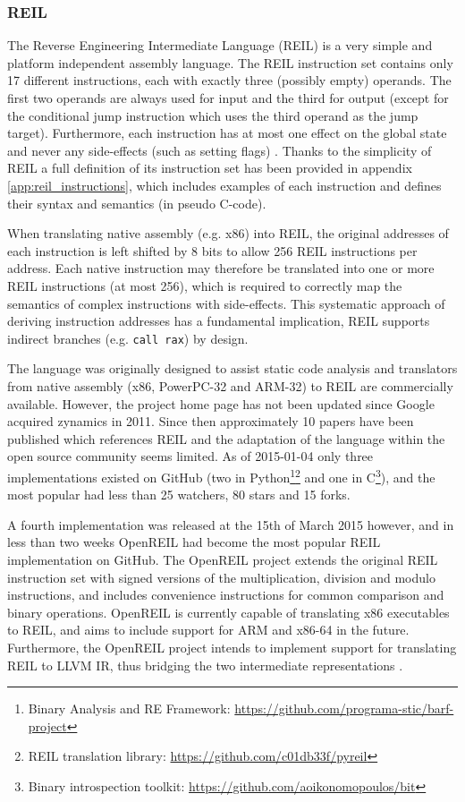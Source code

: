 
\subsubsection{REIL}
\label{sec:lit_review_reil}

The Reverse Engineering Intermediate Language (REIL) is a very simple and platform independent assembly language. The REIL instruction set contains only 17 different instructions, each with exactly three (possibly empty) operands. The first two operands are always used for input and the third for output (except for the conditional jump instruction which uses the third operand as the jump target). Furthermore, each instruction has at most one effect on the global state and never any side-effects (such as setting flags) \cite{reil_paper,reil_spec}. Thanks to the simplicity of REIL a full definition of its instruction set has been provided in appendix \ref{app:reil_instructions}, which includes examples of each instruction and defines their syntax and semantics (in pseudo C-code).

When translating native assembly (e.g. x86) into REIL, the original addresses of each instruction is left shifted by 8 bits to allow 256 REIL instructions per address. Each native instruction may therefore be translated into one or more REIL instructions (at most 256), which is required to correctly map the semantics of complex instructions with side-effects. This systematic approach of deriving instruction addresses has a fundamental implication, REIL supports indirect branches (e.g. \texttt{call rax}) by design.

The language was originally designed to assist static code analysis and translators from native assembly (x86, PowerPC-32 and ARM-32) to REIL are commercially available. However, the project home page has not been updated since Google acquired zynamics in 2011. Since then approximately 10 papers have been published which references REIL and the adaptation of the language within the open source community seems limited. As of 2015-01-04 only three implementations existed on GitHub (two in Python\footnote{Binary Analysis and RE Framework: \url{https://github.com/programa-stic/barf-project}}\footnote{REIL translation library: \url{https://github.com/c01db33f/pyreil}} and one in C\footnote{Binary introspection toolkit: \url{https://github.com/aoikonomopoulos/bit}}), and the most popular had less than 25 watchers, 80 stars and 15 forks.

A fourth implementation was released at the 15th of March 2015 however, and in less than two weeks OpenREIL had become the most popular REIL implementation on GitHub. The OpenREIL project extends the original REIL instruction set with signed versions of the multiplication, division and modulo instructions, and includes convenience instructions for common comparison and binary operations. OpenREIL is currently capable of translating x86 executables to REIL, and aims to include support for ARM and x86-64 in the future. Furthermore, the OpenREIL project intends to implement support for translating REIL to LLVM IR, thus bridging the two intermediate representations \cite{openreil}.
